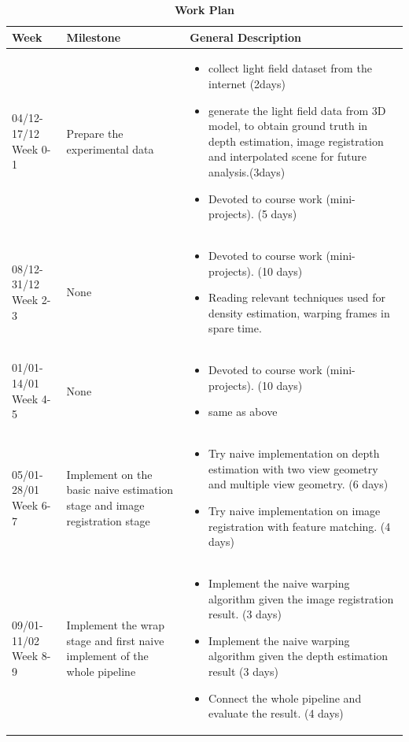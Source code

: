 \documentclass[11pt]{article}
\begin{document}
\begin{longtable}{|p{}|p{}|p{}|}
  \caption{\textbf{Work Plan}}\\
  \hline
  Week & Milestone & General Description \\ \hline

  04/12-17/12 Week 0-1&
  Prepare the experimental data &
  \begin{itemize}
    \item collect light field dataset from the internet (2days)
    \item generate the light field data from 3D model, to obtain ground truth in
      depth estimation, image registration and interpolated scene for future
      analysis.(3days)
    \item Devoted to course work (mini-projects). (5 days)
  \end{itemize}
  \\ \hline
  08/12-31/12 Week 2-3&
  None &
  \begin{itemize}
    \item Devoted to course work (mini-projects). (10 days)
    \item Reading relevant techniques used for density
      estimation, warping frames \cite{huang2017robust} \cite{li2017robust}
      in spare time.
  \end{itemize}
  \\ \hline

  01/01-14/01 Week 4-5&
  None &
  \begin{itemize}
    \item Devoted to course work (mini-projects). (10 days)
    \item same as above
  \end{itemize}
  \\ \hline

  05/01-28/01 Week 6-7&
  Implement on the basic naive estimation stage and image registration stage &
  \begin{itemize}
    \item Try naive implementation on depth estimation with two view geometry
      and multiple view geometry. (6 days)
    \item Try naive implementation on image registration with feature matching.
      (4 days)
  \end{itemize}
  \\ \hline

  09/01-11/02 Week 8-9&
  Implement the wrap stage and first naive implement of the whole pipeline &
  \begin{itemize}
    \item Implement the naive warping algorithm given the image registration
      result. (3 days)
    \item Implement the naive warping algorithm given the depth estimation
      result (3 days)
    \item Connect the whole pipeline and evaluate the result. (4 days)
  \end{itemize}
  \\ \hline


\end{longtable}
\end{document}
